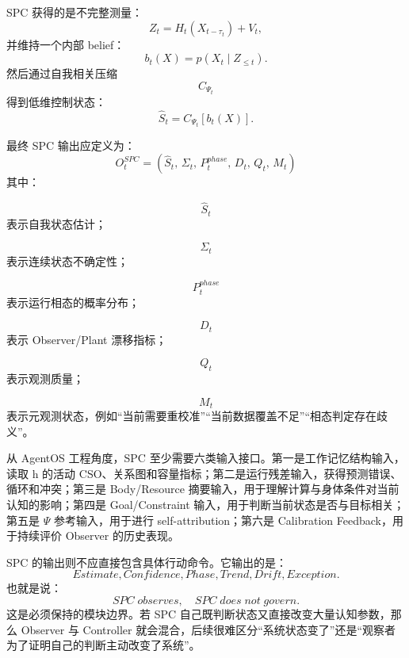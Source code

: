 SPC 获得的是不完整测量：
\begin{equation}
Z_t
=
H_t(X_{t-\tau_t})
+
V_t,
\end{equation}
并维持一个内部 belief：
\begin{equation}
b_t(X)
=
p
\left(
X_t
\mid
Z_{\leq t}
\right).
\end{equation}
然后通过自我相关压缩
\begin{equation}
C_{\Psi_t}
\end{equation}
得到低维控制状态：
\begin{equation}
\hat S_t
=
C_{\Psi_t}
\left[
b_t(X)
\right].
\end{equation}

最终 SPC 输出应定义为：
\begin{equation}
\boxed{
O_t^{SPC}
=
\left(
\hat S_t,\,
\Sigma_t,\,
P_t^{phase},\,
D_t,\,
Q_t,\,
M_t
\right)
}
\end{equation}
其中：

\begin{equation}
\hat S_t
\end{equation}
表示自我状态估计；

\begin{equation}
\Sigma_t
\end{equation}
表示连续状态不确定性；

\begin{equation}
P_t^{phase}
\end{equation}
表示运行相态的概率分布；

\begin{equation}
D_t
\end{equation}
表示 Observer/Plant 漂移指标；

\begin{equation}
Q_t
\end{equation}
表示观测质量；

\begin{equation}
M_t
\end{equation}
表示元观测状态，例如“当前需要重校准”“当前数据覆盖不足”“相态判定存在歧义”。

从 AgentOS 工程角度，SPC 至少需要六类输入接口。第一是工作记忆结构输入，读取 h 的活动 CSO、关系图和容量指标；第二是运行残差输入，获得预测错误、循环和冲突；第三是 Body/Resource 摘要输入，用于理解计算与身体条件对当前认知的影响；第四是 Goal/Constraint 输入，用于判断当前状态是否与目标相关；第五是 $\Psi$ 参考输入，用于进行 self-attribution；第六是 Calibration Feedback，用于持续评价 Observer 的历史表现。

SPC 的输出则不应直接包含具体行动命令。它输出的是：
\begin{equation}
Estimate,
Confidence,
Phase,
Trend,
Drift,
Exception.
\end{equation}
也就是说：
\begin{equation}
\boxed{
SPC\;observes,\quad
SPC\;does\;not\;govern.
}
\end{equation}
这是必须保持的模块边界。若 SPC 自己既判断状态又直接改变大量认知参数，那么 Observer 与 Controller 就会混合，后续很难区分“系统状态变了”还是“观察者为了证明自己的判断主动改变了系统”。


